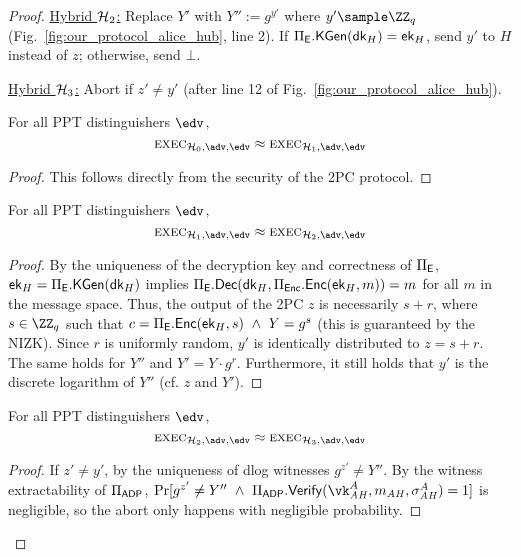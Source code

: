 \begin{proof}
\smallskip
\noindent\underline{Hybrid $\mathcal{H}_2$:} Replace $Y'$ with $Y'' := g^{y'}$ where $y' \sample \ZZ_q$ (Fig.~\ref{fig:our_protocol_alice_hub}, line 2). If $\Pi_{\mathsf{E}}.{\mathsf{KGen}}(\mathsf{dk}_H)=\mathsf{ek}_H$, send $y'$ to $H$ instead of $z$; otherwise, send $\bot$.

\smallskip
\noindent\underline{Hybrid $\mathcal{H}_3$:} Abort if $z' \neq y'$ (after line 12 of Fig.~\ref{fig:our_protocol_alice_hub}).

\smallskip
{}

\begin{claim}
For all PPT distinguishers $\env$,
\[
    \exec_{\hybrid_0,\adv,\env} \approx \exec_{\hybrid_1,\adv,\env}
\]
\end{claim}
\begin{proof}
This follows directly from the security of the 2PC protocol.
\end{proof}

\begin{claim}
For all PPT distinguishers $\env$,
\[
    \exec_{\hybrid_1,\adv,\env} \approx \exec_{\hybrid_2,\adv,\env}
\]
\end{claim}
\begin{proof}
By the uniqueness of the decryption key and correctness of $\Pi_{\mathsf{E}}$, $\mathsf{ek}_H = \Pi_{\mathsf{E}}.{\mathsf{KGen}}(\mathsf{dk}_H)$ implies $\Pi_{\mathsf{E}}.{\mathsf{Dec}}(\mathsf{dk}_H,\Pi_{{\mathsf{Enc}}}.{\mathsf{Enc}}(\mathsf{ek}_H, m)) = m$ for all $m$ in the message space. Thus, the output of the 2PC $z$ is necessarily $s+r$, where $s \in \ZZ_q$ such that $c = \Pi_{\mathsf{E}}.{\mathsf{Enc}}(\mathsf{ek}_H,s) ~\wedge~ Y=g^s$ (this is guaranteed by the NIZK). 
Since $r$ is uniformly random, $y'$ is identically distributed to $z=s+r$. The same holds for $Y''$ and $Y' = Y \cdot g^r$. Furthermore, it still holds that $y'$ is the discrete logarithm of $Y''$ (cf. $z$ and $Y'$).
\end{proof}

\begin{claim}
For all PPT distinguishers $\env$,
\[
    \exec_{\hybrid_2,\adv,\env} \approx \exec_{\hybrid_3,\adv,\env}
\]
\end{claim}
\begin{proof} 
If $z' \neq y'$, by the uniqueness of dlog witnesses $g^{z'} \neq Y''$. By the witness extractability of $\Pi_{\mathsf{ADP}}$, $\Pr[g^{z'} \neq Y'' ~\wedge~ \Pi_\ADP.\vrfy(\vk_\ah^A,m_\ah, \sigma_\ah^A)=1]$ is negligible, so the abort only happens with negligible probability.
\end{proof}


\end{proof}
